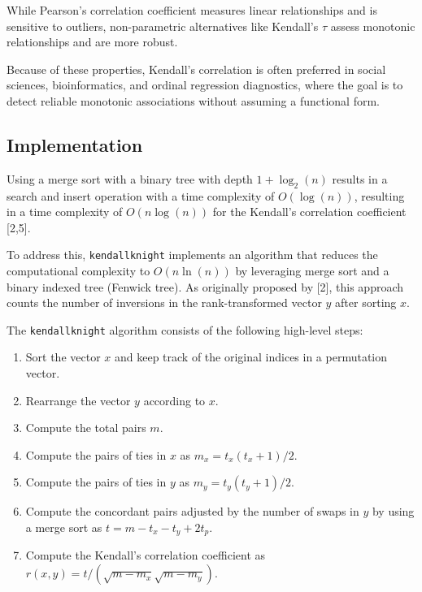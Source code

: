 \documentclass[
  10pt,
  letterpaper,
]{article}
\providecommand{\tightlist}{%
  \setlength{\itemsep}{0pt}\setlength{\parskip}{0pt}}\usepackage{longtable,booktabs,array}
\begin{document}
While Pearson's correlation coefficient measures linear relationships
and is sensitive to outliers, non-parametric alternatives like Kendall's
\(\tau\) assess monotonic relationships and are more robust.

Because of these properties, Kendall's correlation is often preferred in
social sciences, bioinformatics, and ordinal regression diagnostics,
where the goal is to detect reliable monotonic associations without
assuming a functional form.

\subsection{Implementation}\label{implementation}

Using a merge sort with a binary tree with depth \(1 + \log_2(n)\)
results in a search and insert operation with a time complexity of
\(O(\log(n))\), resulting in a time complexity of \(O(n \log(n))\) for
the Kendall's correlation coefficient {[}2,5{]}.

To address this, \texttt{kendallknight} implements an algorithm that
reduces the computational complexity to \(O(n \ln (n))\) by leveraging
merge sort and a binary indexed tree (Fenwick tree). As originally
proposed by {[}2{]}, this approach counts the number of inversions in
the rank-transformed vector \(y\) after sorting \(x\).

The \texttt{kendallknight} algorithm consists of the following
high-level steps:

\begin{enumerate}
\def\labelenumi{\arabic{enumi}.}
\tightlist
\item
  Sort the vector \(x\) and keep track of the original indices in a
  permutation vector.
\item
  Rearrange the vector \(y\) according to \(x\).
\item
  Compute the total pairs \(m\).
\item
  Compute the pairs of ties in \(x\) as \(m_x = t_x (t_x + 1) / 2\).
\item
  Compute the pairs of ties in \(y\) as \(m_y = t_y (t_y + 1) / 2\).
\item
  Compute the concordant pairs adjusted by the number of swaps in \(y\)
  by using a merge sort as \(t = m - t_x - t_y + 2t_p\).
\item
  Compute the Kendall's correlation coefficient as
  \(r(x,y) = t / (\sqrt{m - m_x} \sqrt{m - m_y})\).
\end{enumerate}
\end{document}
